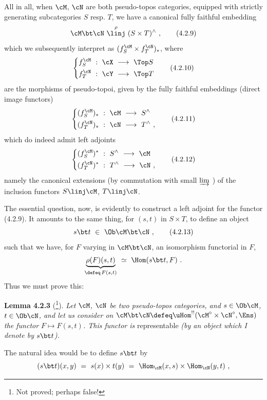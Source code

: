 All in all, when $\cM$, $\cN$ are both pseudo-topos categories, equipped with strictly generating subcategories $S$ resp. $T$, we have a canonical fully faithful embedding
\[
\cM\bt\cN \ \overset{\rho}{\linj}\ (S\times T)^{\wedge} \ ,
\tag*{(4.2.9)}
\]
which we subsequently interpret as $(f_{S}^{\cM}\times f_{T}^{\cN})_{*}$, where
\[
\left\{
\begin{aligned}
f_{S}^{\cM} \ &:\ \cX \ \longrightarrow\ \Top S\\
f_{T}^{\cN} \ &:\ \cY \ \longrightarrow\ \Top T
\end{aligned}
\right.
\tag*{(4.2.10)}
\]
are the morphisms of pseudo-topoi, given by the fully faithful embeddings (direct image functors)
\[
\left\{
\begin{aligned}
(f_{S}^{\cM})_{*} \ &:\ \cM \ \longrightarrow\ S^{\wedge}\\
(f_{T}^{\cN})_{*} \ &:\ \cN \ \longrightarrow\ T^{\wedge} \ ,
\end{aligned}
\right.
\tag*{(4.2.11)}
\]
which do indeed admit left adjoints
\[
\left\{
\begin{aligned}
(f_{S}^{\cM})^{*} \ &:\ S^{\wedge} \ \longrightarrow\ \cM\\
(f_{T}^{\cN})^{*} \ &:\ T^{\wedge} \ \longrightarrow\ \cN \ ,
\end{aligned}
\right.
\tag*{(4.2.12)}
\]
namely the canonical extensions (by commutation with small $\varinjlim$ ) of the inclusion functors $S \linj \cM$, $T \linj \cN$.

The essential question, now, is evidently to construct a left adjoint for the functor (4.2.9). It amounts to the same thing, for $(s,t)$ in $S\times T$, to define an object
\[
s\bt t \ \in\ \Ob\cM\bt\cN \ ,
\tag*{(4.2.13)}
\]
such that we have, for $F$ varying in $\cM\bt\cN$, an isomorphism functorial in $F$,
\[
\underbrace{\rho(F)(s,t)}_{\defeq\, F(s,t)} \ \simeq\ \Hom(s\bt t,F) \ .
\]
Thus we must prove this:

\textbf{Lemma 4.2.3} (\footnote[4]{Not proved; perhaps false!}). \textit{Let $\cM$, $\cN$ be two pseudo-topos categories, and $s\in\Ob\cM$, $t\in\Ob\cN$, and let us consider on $\cM\bt\cN\defeq\uHom^{!!}(\cM^{\circ}\times\cN^{\circ},\Ens)$ the functor $F\longmapsto F(s,t)$. This functor is} representable \textit{(by an object which I denote by $s\bt t$).}

The natural idea would be to define $s\bt t$ by
\[
(s\bt t)(x,y) \ =\ s(x)\times t(y) \ =\ \Hom_{\cM}(x,s)\times\Hom_{\cN}(y,t) \ ,
\]


